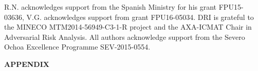 \documentclass[letterpaper]{article} %
\begin{document}
 R.N. acknowledges support from the Spanish Ministry for his grant FPU15-03636, V.G. acknowledges support from grant FPU16-05034. DRI is grateful to the MINECO MTM2014-56949-C3-1-R project and the AXA-ICMAT Chair in Adversarial Risk Analysis. All authors acknowledge support from the Severo Ochoa Excellence Programme SEV-2015-0554.


{
\normalsize
 
}

\newpage

\appendix


{\Large {\bf APPENDIX}}
\end{document}
